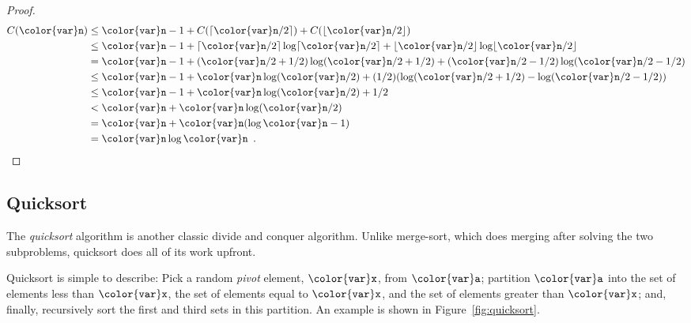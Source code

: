 \documentclass[10pt]{book}
\newcommand{\figref}[1]{Figure~\ref{fig:#1}}
\theoremstyle{plain}
\theoremstyle{definition}
\begin{document}
\begin{proof}
\begin{align*}
  C(\ensuremath{\mathtt{{\color{var}n}}}) 
  &\le \ensuremath{\mathtt{{\color{var}n}}}-1 + C(\lceil \ensuremath{\mathtt{{\color{var}n}}}/2 \rceil) + C(\lfloor \ensuremath{\mathtt{{\color{var}n}}}/2 \rfloor) \\
  &\le \ensuremath{\mathtt{{\color{var}n}}}-1 + \lceil \ensuremath{\mathtt{{\color{var}n}}}/2 \rceil\log \lceil \ensuremath{\mathtt{{\color{var}n}}}/2 \rceil 
           + \lfloor \ensuremath{\mathtt{{\color{var}n}}}/2 \rfloor\log \lfloor \ensuremath{\mathtt{{\color{var}n}}}/2 \rfloor \\
  &= \ensuremath{\mathtt{{\color{var}n}}}-1 + (\ensuremath{\mathtt{{\color{var}n}}}/2 + 1/2)\log (\ensuremath{\mathtt{{\color{var}n}}}/2+1/2) 
           + (\ensuremath{\mathtt{{\color{var}n}}}/2 - 1/2) \log (\ensuremath{\mathtt{{\color{var}n}}}/2-1/2) \\
  &\le \ensuremath{\mathtt{{\color{var}n}}}-1 + \ensuremath{\mathtt{{\color{var}n}}}\log(\ensuremath{\mathtt{{\color{var}n}}}/2) + (1/2)(\log (\ensuremath{\mathtt{{\color{var}n}}}/2+1/2) 
           - \log (\ensuremath{\mathtt{{\color{var}n}}}/2-1/2)) \\
  &\le \ensuremath{\mathtt{{\color{var}n}}}-1 + \ensuremath{\mathtt{{\color{var}n}}}\log(\ensuremath{\mathtt{{\color{var}n}}}/2) + 1/2 \\
  &< \ensuremath{\mathtt{{\color{var}n}}} + \ensuremath{\mathtt{{\color{var}n}}}\log(\ensuremath{\mathtt{{\color{var}n}}}/2) \\
  &= \ensuremath{\mathtt{{\color{var}n}}} + \ensuremath{\mathtt{{\color{var}n}}}(\log\ensuremath{\mathtt{{\color{var}n}}}-1) \\
  &= \ensuremath{\mathtt{{\color{var}n}}}\log\ensuremath{\mathtt{{\color{var}n}}} \enspace . \qedhere
\end{align*} 
\end{proof}

\subsection{Quicksort}

%
The \emph{quicksort} algorithm is another classic divide and conquer
algorithm.  Unlike merge-sort, which does merging after solving the two
subproblems, quicksort does all of its work upfront.

Quicksort is simple to describe:  Pick a random \emph{pivot} element,
%
\ensuremath{\mathtt{{\color{var}x}}}, from \ensuremath{\mathtt{{\color{var}a}}}; partition \ensuremath{\mathtt{{\color{var}a}}} into the set of elements less than \ensuremath{\mathtt{{\color{var}x}}}, the
set of elements equal to \ensuremath{\mathtt{{\color{var}x}}}, and the set of elements greater than \ensuremath{\mathtt{{\color{var}x}}};
and, finally, recursively sort the first and third sets in this partition.
An example is shown in \figref{quicksort}.
\end{document}
